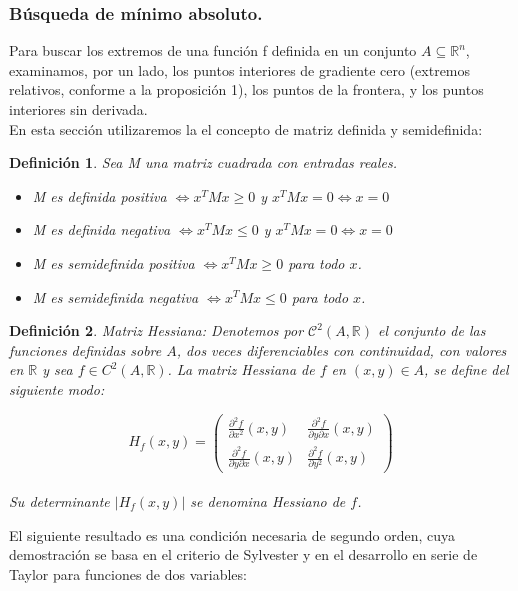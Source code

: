 \documentclass[a4paper,11pt]{article}
\newtheorem{definition}{Definición}
\begin{document}
\subsubsection{Búsqueda de mínimo absoluto.}
Para buscar los extremos de una función f definida en un conjunto $A\subseteq \mathbb{R}^n$, examinamos, por un lado, los
puntos interiores de gradiente cero (extremos relativos, conforme a la proposición
1), los puntos de la frontera, y los puntos interiores sin derivada. \\

\noindent
En esta sección utilizaremos la el concepto de matriz definida y semidefinida:
\begin{definition}Sea M una matriz cuadrada con entradas reales.
\begin{itemize}
\item M es definida positiva $\Longleftrightarrow x^TMx \geq 0$ y $x^TMx=0\Leftrightarrow x=0$
\item M es definida negativa  $\Longleftrightarrow x^TMx \leq0$ y $x^TMx=0\Leftrightarrow x=0$
\item M es semidefinida positiva  $\Longleftrightarrow x^TMx \geq0$ para todo $x$.
\item M es semidefinida negativa  $\Longleftrightarrow x^TMx \leq0$  para todo $x$.
\end{itemize}
\end{definition}
\begin{definition}
Matriz Hessiana:  Denotemos por $\mathcal{C}^2(A,\mathbb{R})$  el conjunto de las funciones definidas
sobre $A$, dos veces diferenciables con continuidad, con valores en $\mathbb{R}$ y sea $f \in
C^2(A, \mathbb{R})$. La matriz Hessiana de $f$ en $(x, y) \in A$, se define del siguiente modo:

$$
H_f(x,y)=\left(
\begin{array}{cc}
\frac{\partial^2f}{\partial x^2}(x,y) & \frac{\partial^2f}{\partial y\partial x}(x,y) \\
\frac{\partial^2f}{\partial y\partial x}(x,y) & \frac{\partial^2f}{\partial y^2}(x,y)
\end{array}
\right)
$$
\\
Su determinante $|H_f(x,y)|$ se denomina Hessiano de $f$.
\end{definition}
El siguiente resultado es una condición necesaria de segundo orden, cuya demostración se basa en el criterio de Sylvester y en el desarrollo en serie de Taylor
para funciones de dos variables:
\end{document}
